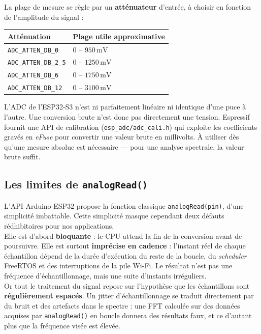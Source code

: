 La plage de mesure se règle par un \textbf{atténuateur} d'entrée, à choisir en fonction de l'amplitude du signal :

\begin{center}
\begin{tabular}{|l|l|}
\hline
\textbf{Atténuation} & \textbf{Plage utile approximative} \\
\hline
\texttt{ADC\_ATTEN\_DB\_0}  & $0$ -- $950\,\mathrm{mV}$ \\
\texttt{ADC\_ATTEN\_DB\_2\_5} & $0$ -- $1250\,\mathrm{mV}$ \\
\texttt{ADC\_ATTEN\_DB\_6}  & $0$ -- $1750\,\mathrm{mV}$ \\
\texttt{ADC\_ATTEN\_DB\_12} & $0$ -- $3100\,\mathrm{mV}$ \\
\hline
\end{tabular}
\end{center}

\begin{imp}
L'ADC de l'ESP32-S3 n'est ni parfaitement linéaire ni identique d'une puce à l'autre. Une conversion brute n'est donc pas directement une tension. Espressif fournit une API de calibration (\texttt{esp\_adc/adc\_cali.h}) qui exploite les coefficients gravés en \textit{eFuse} pour convertir une valeur brute en millivolts. À utiliser dès qu'une mesure absolue est nécessaire — pour une analyse spectrale, la valeur brute suffit.
\end{imp}

\subsection{Les limites de \texttt{analogRead()}}

L'API Arduino-ESP32 propose la fonction classique \texttt{analogRead(pin)}, d'une simplicité imbattable. Cette simplicité masque cependant deux défauts rédhibitoires pour nos applications.\\

Elle est d'abord \textbf{bloquante} : le CPU attend la fin de la conversion avant de poursuivre. Elle est surtout \textbf{imprécise en cadence} : l'instant réel de chaque échantillon dépend de la durée d'exécution du reste de la boucle, du \textit{scheduler} FreeRTOS et des interruptions de la pile Wi-Fi. Le résultat n'est pas une fréquence d'échantillonnage, mais une suite d'instants irréguliers.\\

Or tout le traitement du signal repose sur l'hypothèse que les échantillons sont \textbf{régulièrement espacés}. Un jitter d'échantillonnage se traduit directement par du bruit et des artefacts dans le spectre : une FFT calculée sur des données acquises par \texttt{analogRead()} en boucle donnera des résultats faux, et ce d'autant plus que la fréquence visée est élevée.\\

